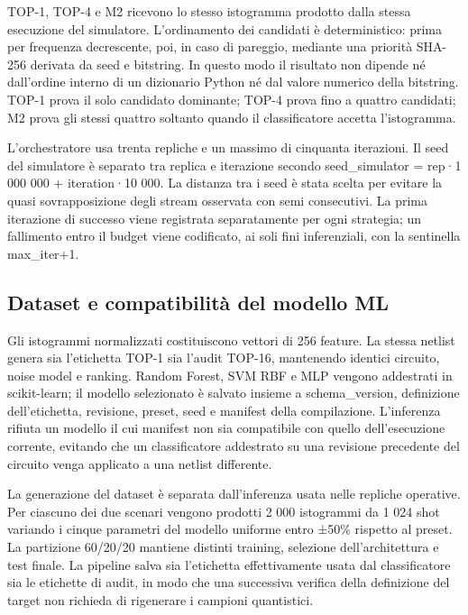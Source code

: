TOP-1, TOP-4 e M2 ricevono lo stesso istogramma prodotto dalla stessa esecuzione del simulatore. L'ordinamento dei candidati è deterministico: prima per frequenza decrescente, poi, in caso di pareggio, mediante una priorità SHA-256 derivata da seed e bitstring. In questo modo il risultato non dipende né dall'ordine interno di un dizionario Python né dal valore numerico della bitstring. TOP-1 prova il solo candidato dominante; TOP-4 prova fino a quattro candidati; M2 prova gli stessi quattro soltanto quando il classificatore accetta l'istogramma.

L'orchestratore usa trenta repliche e un massimo di cinquanta iterazioni. Il seed del simulatore è separato tra replica e iterazione secondo seed\_simulator = rep·1 000 000 + iteration·10 000. La distanza tra i seed è stata scelta per evitare la quasi sovrapposizione degli stream osservata con semi consecutivi. La prima iterazione di successo viene registrata separatamente per ogni strategia; un fallimento entro il budget viene codificato, ai soli fini inferenziali, con la sentinella max\_iter+1.

\subsection{Dataset e compatibilità del modello ML}\label{sec:finale_4_5_2}

Gli istogrammi normalizzati costituiscono vettori di 256 feature. La stessa netlist genera sia l'etichetta TOP-1 sia l'audit TOP-16, mantenendo identici circuito, noise model e ranking. Random Forest, SVM RBF e MLP vengono addestrati in scikit-learn; il modello selezionato è salvato insieme a schema\_version, definizione dell'etichetta, revisione, preset, seed e manifest della compilazione. L'inferenza rifiuta un modello il cui manifest non sia compatibile con quello dell'esecuzione corrente, evitando che un classificatore addestrato su una revisione precedente del circuito venga applicato a una netlist differente.

La generazione del dataset è separata dall'inferenza usata nelle repliche operative. Per ciascuno dei due scenari vengono prodotti 2 000 istogrammi da 1 024 shot variando i cinque parametri del modello uniforme entro ±50\% rispetto al preset. La partizione 60/20/20 mantiene distinti training, selezione dell'architettura e test finale. La pipeline salva sia l'etichetta effettivamente usata dal classificatore sia le etichette di audit, in modo che una successiva verifica della definizione del target non richieda di rigenerare i campioni quantistici.

